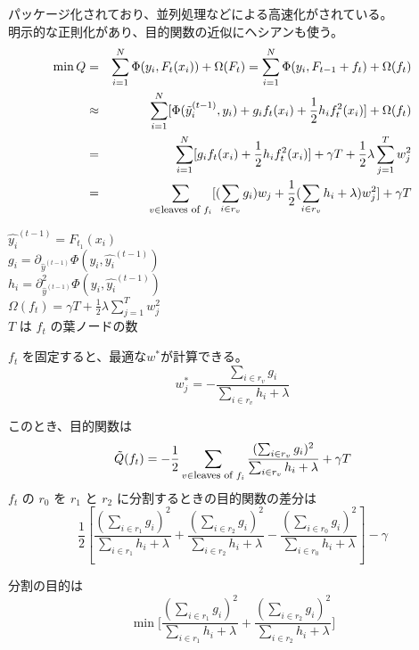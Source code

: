\begin{tcolorbox}[title={\Large XGBoost}]
	パッケージ化されており、並列処理などによる高速化がされている。 \\
	明示的な正則化があり、目的関数の近似にヘシアンも使う。 \\
	\color{ash}
	\begin{eqnarray*}
		\min Q
		&=& \sum^N_{i=1} \Phi(y_i, F_t(x_i)) + \Omega(F_t)
		= \sum^N_{i=1} \Phi(y_i, F_{t-1} + f_t) + \Omega(f_t)  \\
		&\approx& \sum^N_{i=1} [ \Phi(\tilde{y}^{(t-1)}_i, y_i) +g_if_t(x_i) + \frac{1}{2}h_if_t^{\large 2}(x_i) ] +\Omega(f_t) \\
		&=& \sum^N_{i=1} [ g_if_t(x_i) + \frac{1}{2}h_if_t^{\large 2}(x_i) ] +
		\gamma T + \frac{1}{2} \lambda \sum^T_{j=1} w_j^2 \\
		&=& \sum_{v \in \mbox{\footnotesize leaves of }f_i} [ (\sum_{i \in r_v} g_i) w_j + \frac{1}{2} (\sum_{i \in r_v}h_i + \lambda) w_j^2 ]
		+ \gamma T \\
	\end{eqnarray*}

	\hspace{600px}
	\begin{minipage}[t]{0.45\hsize}
		$ \hat{y_i}^{(t-1)}  = F_{t_1}(x_i) $ \\
		$ g_i  = \partial_{\hat{y}^(t-1)} \Phi(y_i, \hat{y_i}^{(t-1)}) $ \\
		$ h_i  = \partial^2_{\hat{y}^(t-1)} \Phi(y_i, \hat{y_i}^{(t-1)}) $ \\
		$ \Omega(f_t) = \gamma T + \frac{1}{2} \lambda \sum^T_{j=1} w_j^2 $ \\
		$T$ は $f_t$ の葉ノードの数 \\
	\end{minipage}

	$f_t$ を固定すると、最適な$w^\ast$が計算できる。
	\[ w^\ast_j = - \frac{\sum_{i \in r_v}g_i}{\sum_{i \in r_v}h_i + \lambda} \]

	このとき、目的関数は
	\[
		\tilde{Q}(f_t) = - \frac{1}{2} \sum_{v \in \mbox{\footnotesize leaves of }f_i}
		\frac{(\sum_{i \in r_v}g_i)^2}{\sum_{i \in r_v}h_i + \lambda} + \gamma T
	\]
	$f_t$ の $r_0$ を $r_1$ と $r_2$ に分割するときの目的関数の差分は
	\[
		\frac{1}{2} [
			\frac{(\sum_{i \in r_1}g_i)^2}{\sum_{i \in r_1}h_i + \lambda}
			+ \frac{(\sum_{i \in r_2}g_i)^2}{\sum_{i \in r_2}h_i + \lambda}
			- \frac{(\sum_{i \in r_0}g_i)^2}{\sum_{i \in r_0}h_i + \lambda}
		] - \gamma
	\]

	\color{black}
	\normalsize
	分割の目的は
	\[
		\min \Biggl[
			\frac{(\sum_{i \in r_1}g_i)^2}{\sum_{i \in r_1}h_i + \lambda}
			+ \frac{(\sum_{i \in r_2}g_i)^2}{\sum_{i \in r_2}h_i + \lambda}
		\Biggr]
	\]


\end{tcolorbox}
